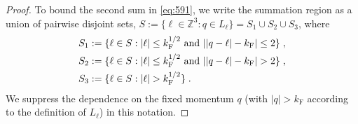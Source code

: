 \documentclass[12pt,a4paper]{article}
\numberwithin{equation}{section}
\newcommand{\1}{\mathbb{I}}
\newcommand{\F}{\mathrm{F}}
\newcommand{\kF}{k_\F}
\newcommand{\Zstar}{\mathbb{Z}^3} %
\newcommand{\Z}{\mathbb{Z}}
\theoremstyle{plain}
\theoremstyle{definition}
\theoremstyle{remark}
\theoremstyle{plain}
\theoremstyle{definition}
\theoremstyle{remark}
\begin{document}
\begin{proof}
To bound the second sum in \eqref{eq:591}, we write the summation region as a union of pairwise disjoint sets, $ S := \{ \ell \in \Zstar : q \in L_\ell \} = S_1 \cup S_2 \cup S_3 $, where
\begin{displaymath}
\begin{split}
	S_1 & := \{ \ell \in S : |\ell| \le \kF^{1/2} \textnormal{ and } ||q-\ell|-\kF| \le 2 \} \;, \\
	S_2 & := \{ \ell \in S : |\ell| \le \kF^{1/2}  \textnormal{ and } ||q-\ell|-\kF| > 2  \} \;, \\
	S_3 & := \{ \ell \in S : |\ell| > \kF^{1/2} \} \;.
\end{split}
\end{displaymath}
We suppress the dependence on the fixed momentum $q$ (with $\lvert q\rvert > \kF$ according to the definition of $L_\ell$) in this notation.


\end{proof}
\end{document}
